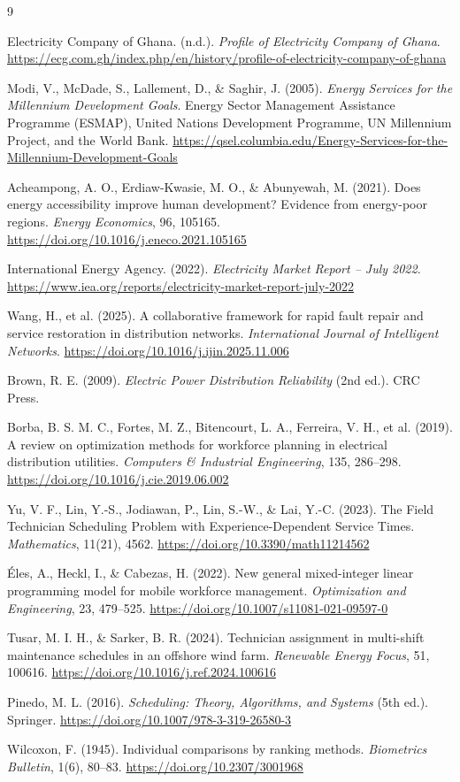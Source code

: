 \documentclass[11pt]{article}
\begin{document}
\begin{thebibliography}{9}

Electricity Company of Ghana. (n.d.).
\textit{Profile of Electricity Company of Ghana}.
\url{https://ecg.com.gh/index.php/en/history/profile-of-electricity-company-of-ghana}

Modi, V., McDade, S., Lallement, D., \& Saghir, J. (2005).
\textit{Energy Services for the Millennium Development Goals}.
Energy Sector Management Assistance Programme (ESMAP), United Nations Development Programme, UN Millennium Project, and the World Bank.
\url{https://qsel.columbia.edu/Energy-Services-for-the-Millennium-Development-Goals}

Acheampong, A. O., Erdiaw-Kwasie, M. O., \& Abunyewah, M. (2021).
Does energy accessibility improve human development? Evidence from energy-poor regions.
\textit{Energy Economics}, 96, 105165.
\url{https://doi.org/10.1016/j.eneco.2021.105165}

International Energy Agency. (2022).
\textit{Electricity Market Report -- July 2022}.
\url{https://www.iea.org/reports/electricity-market-report-july-2022}

Wang, H., et al. (2025).
A collaborative framework for rapid fault repair and service restoration in distribution networks.
\textit{International Journal of Intelligent Networks}.
\url{https://doi.org/10.1016/j.ijin.2025.11.006}

Brown, R. E. (2009). \textit{Electric Power Distribution Reliability} (2nd ed.). CRC Press.

Borba, B. S. M. C., Fortes, M. Z., Bitencourt, L. A., Ferreira, V. H., et al. (2019). A review on optimization methods for workforce planning in electrical distribution utilities.
\textit{Computers \& Industrial Engineering}, 135, 286--298.
\url{https://doi.org/10.1016/j.cie.2019.06.002}

Yu, V. F., Lin, Y.-S., Jodiawan, P., Lin, S.-W., \& Lai, Y.-C. (2023).
The Field Technician Scheduling Problem with Experience-Dependent Service Times.
\textit{Mathematics}, 11(21), 4562.
\url{https://doi.org/10.3390/math11214562}

Éles, A., Heckl, I., \& Cabezas, H. (2022). New general mixed-integer linear programming model for mobile workforce management. \textit{Optimization and Engineering}, 23, 479--525.
\url{https://doi.org/10.1007/s11081-021-09597-0}

Tusar, M. I. H., \& Sarker, B. R. (2024). Technician assignment in multi-shift maintenance schedules in an offshore wind farm. \textit{Renewable Energy Focus}, 51, 100616.
\url{https://doi.org/10.1016/j.ref.2024.100616}

Pinedo, M. L. (2016). \textit{Scheduling: Theory, Algorithms, and Systems} (5th ed.). Springer.
\url{https://doi.org/10.1007/978-3-319-26580-3}

Wilcoxon, F. (1945). Individual comparisons by ranking methods.
\textit{Biometrics Bulletin}, 1(6), 80--83.
\url{https://doi.org/10.2307/3001968}

\end{thebibliography}
\end{document}
